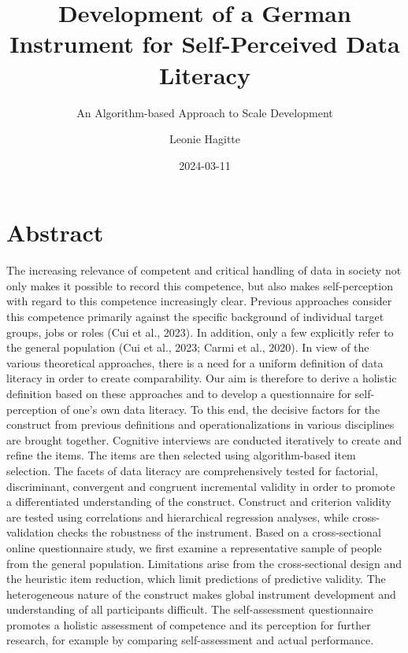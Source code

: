 \documentclass[
  12pt,
  a4paper,
  twoside]{article}
\title{Development of a German Instrument for Self-Perceived Data Literacy}
\subtitle{An Algorithm-based Approach to Scale Development}
\author{Leonie Hagitte}
\date{2024-03-11}
\begin{document}
\maketitle

{
\setcounter{tocdepth}{2}
\tableofcontents
}
\newpage\null\thispagestyle{empty}\newpage

\hypertarget{abstract}{%
\section*{Abstract}\label{abstract}}

The increasing relevance of competent and critical handling of data in society not only makes it possible to record this competence, but also makes self-perception with regard to this competence increasingly clear. Previous approaches consider this competence primarily against the specific background of individual target groups, jobs or roles (Cui et al., 2023). In addition, only a few explicitly refer to the general population (Cui et al., 2023; Carmi et al., 2020). In view of the various theoretical approaches, there is a need for a uniform definition of data literacy in order to create comparability.
Our aim is therefore to derive a holistic definition based on these approaches and to develop a questionnaire for self-perception of one's own data literacy. To this end, the decisive factors for the construct from previous definitions and operationalizations in various disciplines are brought together. Cognitive interviews are conducted iteratively to create and refine the items. The items are then selected using algorithm-based item selection. The facets of data literacy are comprehensively tested for factorial, discriminant, convergent and congruent incremental validity in order to promote a differentiated understanding of the construct. Construct and criterion validity are tested using correlations and hierarchical regression analyses, while cross-validation checks the robustness of the instrument.
Based on a cross-sectional online questionnaire study, we first examine a representative sample of people from the general population. Limitations arise from the cross-sectional design and the heuristic item reduction, which limit predictions of predictive validity. The heterogeneous nature of the construct makes global instrument development and understanding of all participants difficult.
The self-assessment questionnaire promotes a holistic assessment of competence and its perception for further research, for example by comparing self-assessment and actual performance.
\end{document}
